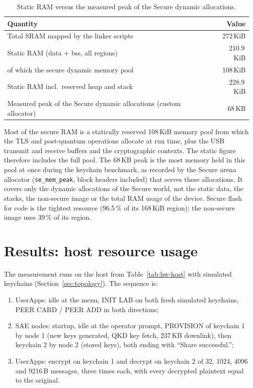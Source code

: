 \documentclass[11pt,a4paper]{report}
\begin{document}
\begin{table}[htbp]
\centering\small
\begin{tabular}{lr}
\toprule
Quantity & Value \\
\midrule
Total SRAM mapped by the linker scripts & 272\,KiB \\
Static RAM (data + bss, all regions) & 210.9\,KiB \\
\quad of which the secure dynamic memory pool & 108\,KiB \\
Static RAM incl.\ reserved heap and stack & 228.9\,KiB \\
Measured peak of the Secure dynamic allocations (custom allocator) & 68\,KB \\
\bottomrule
\end{tabular}
\caption{Static RAM versus the measured peak of the Secure dynamic allocations.}
\label{tab:ram-peak}
\end{table}

Most of the secure RAM is a statically reserved 108\,KiB memory pool from which the TLS and post-quantum operations allocate at run time, plus the USB transmit and receive buffers and the cryptographic contexts. The static figure therefore includes the full pool. The 68\,KB peak is the most memory held in this pool at once during the keychain benchmark, as recorded by the Secure arena allocator (\texttt{se\_mem\_peak}, block headers included) that serves these allocations. It covers only the dynamic allocations of the Secure world, not the static data, the stacks, the non-secure image or the total RAM usage of the device. Secure flash for code is the tightest resource (96.5\,\% of its 168\,KiB region); the non-secure image uses 39\,\% of its region.

\chapter{Results: host resource usage}

The measurement runs on the host from Table~\ref{tab:hw-host} with simulated keychains (Section~\ref{sec:topology}). The sequence is:

\begin{enumerate}
\item UserApps: idle at the menu, INIT LAB on both fresh simulated keychains, PEER CARD / PEER ADD in both directions;
\item SAE nodes: startup, idle at the operator prompt, PROVISION of keychain 1 by node 1 (new keys generated, QKD key fetch, 237\,KB downlink), then keychain 2 by node 2 (stored keys), both ending with ``Share successful.'';
\item UserApps: encrypt on keychain 1 and decrypt on keychain 2 of 32, 1024, 4096 and 9216\,B messages, three times each, with every decrypted plaintext equal to the original.
\end{enumerate}
\end{document}
